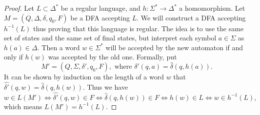 

\setcounter{section}{4}
\setcounter{subsection}{0}
\setcounter{dfn}{17}

\begin{proof}
Let $L \subset \Delta^*$ be a regular language, and $h \colon \Sigma^* \to \Delta^*$ a homomorphism.
Let $M = (Q, \Delta, \delta, q_0, F)$ be a DFA accepting $L$.
We will construct a DFA accepting $h^{-1}(L)$ thus proving that this language is regular.
The idea is to use the same set of states and the same set of final states, but interpret each symbol $a \in \Sigma$ as $h(a) \in \Delta$.
Then a word $w \in \Sigma^*$ will be accepted by the new automaton if and only if $h(w)$ was accepted by the old one.
Formally, put
\[
M' = (Q, \Sigma, \delta', q_0, F), \text{ where }\delta'(q, a) = \widehat{\delta}(q, h(a)).
\]
It can be shown by induction on the length of a word $w$ that $\widehat{\delta'}(q, w) = \widehat{\delta}(q, h(w))$.
Thus we have
\[
w \in L(M') \Leftrightarrow \widehat{\delta'}(q, w) \in F \Leftrightarrow \widehat{\delta}(q, h(w)) \in F \Leftrightarrow h(w) \in L
\Leftrightarrow w \in h^{-1}(L),
\]
which means $L(M') = h^{-1}(L)$.
\end{proof}






